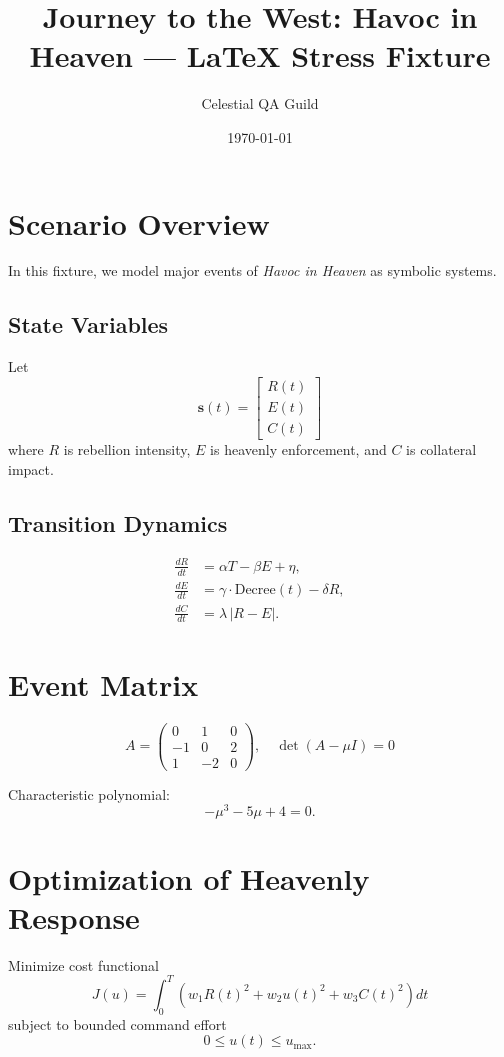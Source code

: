 \documentclass{article}
\title{Journey to the West: Havoc in Heaven --- LaTeX Stress Fixture}
\author{Celestial QA Guild}
\date{\today}
\begin{document}
\maketitle

\section{Scenario Overview}
In this fixture, we model major events of \emph{Havoc in Heaven} as symbolic systems.

\subsection{State Variables}
Let
\[
\mathbf{s}(t)=\begin{bmatrix}
R(t) \\
E(t) \\
C(t)
\end{bmatrix}
\]
where $R$ is rebellion intensity, $E$ is heavenly enforcement, and $C$ is collateral impact.

\subsection{Transition Dynamics}
\begin{align}
\frac{dR}{dt} &= \alpha T - \beta E + \eta, \\
\frac{dE}{dt} &= \gamma \cdot \text{Decree}(t) - \delta R, \\
\frac{dC}{dt} &= \lambda \, |R-E|.
\end{align}

\section{Event Matrix}
\[
A = \begin{pmatrix}
0 & 1 & 0 \\
-1 & 0 & 2 \\
1 & -2 & 0
\end{pmatrix}, \quad
\det(A-\mu I)=0
\]

Characteristic polynomial:
\[
-\mu^3 - 5\mu + 4 = 0.
\]

\section{Optimization of Heavenly Response}
Minimize cost functional
\[
J(u)=\int_0^T \left( w_1 R(t)^2 + w_2 u(t)^2 + w_3 C(t)^2 \right) dt
\]
subject to bounded command effort
\[
0 \le u(t) \le u_{\max}.
\]
\end{document}
